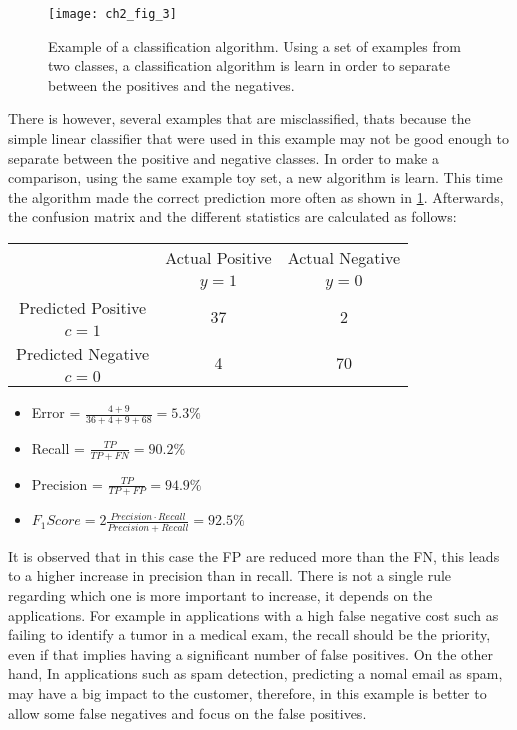\begin{figure}[b!]
	\centering
	\texttt{[image: ch2\_fig\_3]}
	\caption{Example of a classification algorithm. Using a set of examples from two classes, a 
	classification algorithm is learn in order to separate between the positives and the negatives. }
	\label{fig:ch2:2}
\end{figure}

There is however, several examples that are misclassified, thats because the simple linear 
classifier that were used in this example may not be good enough to separate between the positive 
and negative classes. In order to make a comparison, using the same example toy set, a new 
algorithm is learn. This time the algorithm made the correct prediction more often as shown in 
\figurename{ \ref{fig:ch2:2}}. Afterwards, the confusion matrix and the different statistics are 
calculated as follows:
\begin{center}
		\footnotesize
    \begin{tabular}{c|c|c}
			\multicolumn{1}{c|}{}  & Actual Positive& Actual Negative \\
			\multicolumn{1}{c|}{} & $y=1$& $y=0$ \\
			\hline
			Predicted Positive 		& \multirow{ 2}{*}{37} & \multirow{ 
			2}{*}{2} \\
			$c=1$ & &\\
			\hline
			Predicted Negative  	& \multirow{ 2}{*}{4} & \multirow{ 
			2}{*}{70} \\
			$c=0$ & &\\
		\end{tabular}
\end{center}
  \begin{itemize}
    \item Error = $\frac{4+9}{36+4+9+68}=5.3\%$
    \item Recall = $\frac{TP}{TP+FN}=90.2\%$
    \item Precision = $\frac{TP}{TP+FP}=94.9\%$
    \item $F_1Score = 2\frac{Precision \cdot Recall}{Precision + Recall}=92.5\%$
  \end{itemize}
It is observed that in this case the FP are reduced more than the FN, this leads to a higher 
increase in precision  than in recall. There is not a single rule regarding which one is more 
important to increase, it depends on the applications. For example in applications with a high 
false negative cost such as failing to identify a tumor in a medical exam, the recall should be the 
priority, even if that implies having a significant number of false positives. On the other hand, 
In applications such as spam detection, predicting a nomal email as spam, may have a big impact to 
the customer, therefore, in this example is better to allow some false negatives and focus on the 
false positives.


